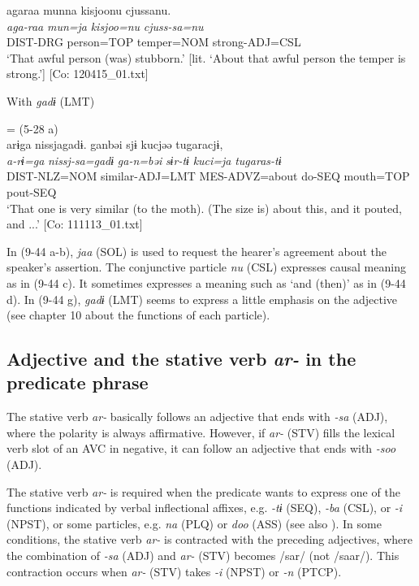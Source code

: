 \ex %
 \glll  agaraa  munna  kisjoonu  cjussanu.\\
      \textit{aga-raa}  \textit{mun=ja}  \textit{kisjoo=nu}  \textit{cjuss{}-sa=nu}\\
      DIST-DRG  person=TOP  temper=NOM  strong-ADJ=CSL\\
      \glt       ‘That awful person (was) stubborn.’ [lit. ‘About that awful person the temper is strong.’] [Co: 120415\_01.txt]

\exi{}  With \textit{gadɨ} (LMT)

\ex{} = (5-28 a)\\
    \glll  arɨga  nissjagadɨ.  ganbəi  sjɨ  kucjəə  tugaracjɨ,\\
      \textit{a-rɨ=ga}  \textit{nissj-sa=gadɨ}  \textit{ga-n=bəi}  \textit{sɨr-tɨ}   \textit{kuci=ja}  \textit{tugaras-tɨ}\\
      DIST-NLZ=NOM  similar-ADJ=LMT  MES-ADVZ=about  do-SEQ  mouth=TOP  pout-SEQ      \\
      \glt       ‘That one is very similar (to the moth). (The size is) about this, and it pouted, and ...’ [Co: 111113\_01.txt]
    \z
\z

In (9-44 a-b), \textit{jaa} (SOL) is used to request the hearer’s agreement about the speaker’s assertion. The conjunctive particle \textit{nu} (CSL) expresses causal meaning as in (9-44 c). It sometimes expresses a meaning such as ‘and (then)’ as in (9-44 d). In (9-44 g), \textit{gadɨ} (LMT) seems to express a little emphasis on the adjective (see chapter 10 about the functions of each particle).

\subsection{Adjective and the stative verb \textit{ar-} in the predicate phrase}\label{sec:9.2.2}

The stative verb \textit{ar-} basically follows an adjective that ends with \textit{{}-sa} (ADJ), where the polarity is always affirmative. However, if \textit{ar-} (STV) fills the lexical verb slot of an AVC in negative, it can follow an adjective that ends with \textit{{}-soo} (ADJ).

The stative verb \textit{ar-} is required when the predicate wants to express one of the functions indicated by verbal inflectional affixes, e.g. \textit{{}-tɨ} (SEQ), \textit{{}-ba} (CSL), or \textit{-i} (NPST), or some particles, e.g. \textit{na} (PLQ) or \textit{doo} (ASS) (see also ). In some conditions, the stative verb \textit{ar-} is contracted with the preceding adjectives, where the combination of \textit{{}-sa} (ADJ) and \textit{ar-} (STV) becomes /sar/ (not /saar/). This contraction occurs when \textit{ar-} (STV) takes \textit{{}-i} (NPST) or \textit{{}-n} (PTCP).

